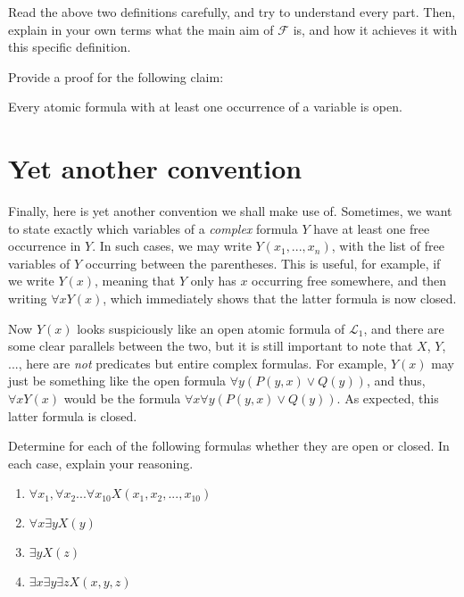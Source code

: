 \begin{exc}
Read the above two definitions carefully, and try to understand every part. Then, explain in your own terms what the main aim of $\mathcal{F}$ is, and how it achieves it with this specific definition. 
\end{exc}

\begin{defn}
Provide a proof for the following claim: 
\begin{center}Every atomic formula with at least one occurrence of a variable is open.
	\end{center}
\end{defn}

\section{Yet another convention}

Finally, here is yet another convention we shall make use of. Sometimes, we want to state exactly which variables of a \textit{complex} formula $Y$ have at least one free occurrence in $Y$. In such cases, we may write $Y(x_1, ..., x_n)$, with the list of free variables of $Y$ occurring between the parentheses. This is useful, for example, if we write $Y(x)$, meaning that $Y$ only has $x$ occurring free somewhere, and then writing $\forall x Y(x)$, which immediately shows that the latter formula is now closed. 

Now $Y(x)$ looks suspiciously like an open atomic formula of $\mathcal{L}_1$, and there are some clear parallels between the two, but it is still important to note that $X$, $Y$, ..., here are \textit{not} predicates but entire complex formulas. For example, $Y(x)$ may just be something like the open formula $\forall y(P(y, x) \vee Q(y))$, and thus, $\forall x Y(x)$ would be the formula $\forall x\forall y(P(y, x) \vee Q(y))$. As expected, this latter formula is closed. 

\begin{exc}
Determine for each of the following formulas whether they are open or closed. In each case, explain your reasoning. 

\begin{enumerate}
	\item $\forall x_1, \forall x_2 ... \forall x_{10} X(x_1, x_2, ..., x_{10})$
	\item $\forall x \exists y X(y)$
	\item $\exists y X(z)$
	\item $\exists x \exists y \exists z X(x, y, z)$
\end{enumerate}
\end{exc}

